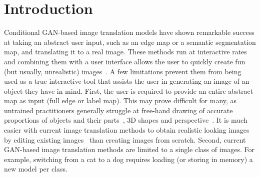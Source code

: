 


\section{Introduction}

Conditional GAN-based image translation \cite{isola2016image2image,sangkloy2017scribbler,zhu2017unpaired} models have shown remarkable success at taking an abstract user input, such as an edge map or a semantic segmentation map, and translating it to a real image. These methods run at interactive rates and combining them with a user interface allows the user to quickly create fun (but usually, unrealistic) images~\cite{edges2cats_demo}. A few limitations prevent them from being used as a true interactive tool that assists the user in generating an image of an object they have in mind. First, the user is required to provide an entire abstract map as input (full edge or label map). This may prove difficult for many, as untrained practitioners generally struggle at free-hand drawing of accurate proportions of objects and their parts~\cite{cohen1997can}, 3D shapes and perspective~\cite{schmidt2009expert}. It is much easier with current image translation methods to obtain realistic looking images by editing existing images~\cite{dekel2018sparse,portenier2018faceshop} than creating images from scratch. Second, current GAN-based image translation methods are limited to a single class of images. For example, switching from a cat to a dog requires loading (or storing in memory) a new model per class. %


